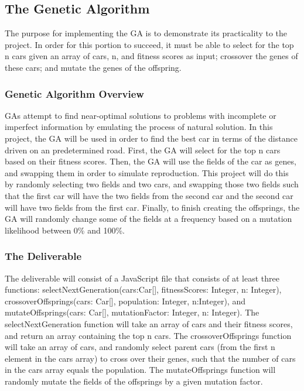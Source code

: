 \documentclass{article}
\begin{document}
\subsection{The Genetic Algorithm}
The purpose for implementing the GA is to demonstrate its practicality to 
the project. In order for this portion to succeed, it must be able to select for 
the top n cars given an array of cars, n, and fitness scores as input; crossover 
the genes of these cars; and mutate the genes of the offspring.

\subsubsection{Genetic Algorithm Overview}
GAs attempt to find near-optimal solutions to problems with incomplete or 
imperfect information by emulating the process of natural solution. In this 
project, the GA will be used in order to find the best car in terms of the 
distance driven on an predetermined road. First, the GA will select for the top 
n cars based on their fitness scores. Then, the GA will use the fields of the 
car as genes, and swapping them in order to simulate reproduction. This project 
will do this by randomly selecting two fields and two cars, and swapping those 
two fields such that the first car will have the two fields from the second car 
and the second car will have two fields from the first car. Finally, to finish 
creating the offsprings, the GA will randomly change some of the fields at a 
frequency based on a mutation likelihood between 0\% and 100\%. 

\subsubsection{The Deliverable}
The deliverable will consist of a JavaScript file that consists of at least 
three functions: selectNextGeneration(cars:Car[], fitnessScores: Integer, n: 
Integer), crossoverOffsprings(cars: Car[], population: Integer, n:Integer), and 
mutateOffsprings(cars: Car[], mutationFactor: Integer, n: Integer). The 
selectNextGeneration function will take an array of cars and their fitness 
scores, and return an array containing the top n cars. The crossoverOffsprings 
function will take an array of cars, and randomly select parent cars (from the 
first n element in the cars array) to cross over their genes, such that the 
number of cars in the cars array equals the population. The mutateOffsprings 
function will randomly mutate the fields of the offsprings by a given mutation 
factor.
\end{document}
